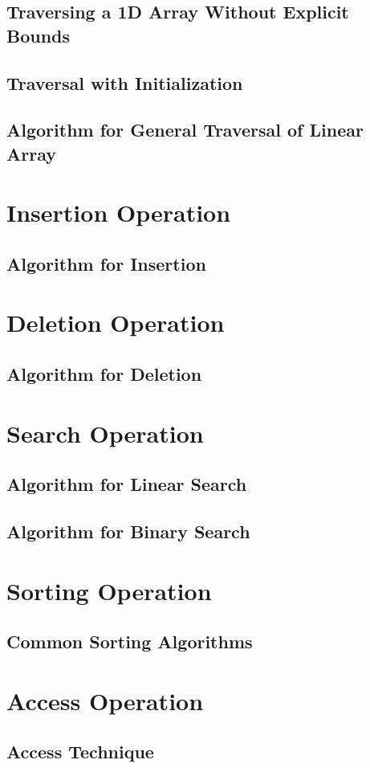 \documentclass[12pt, oneside]{book}
\begin{document}
\subsection{Traversing a 1D Array Without Explicit Bounds}
\subsection{Traversal with Initialization}
\subsection{Algorithm for General Traversal of Linear Array}
\section{Insertion Operation}
\subsection*{Algorithm for Insertion}
\section{Deletion Operation}
\subsection*{Algorithm for Deletion}
\section{Search Operation}
\subsection*{Algorithm for Linear Search}
\subsection*{Algorithm for Binary Search}
\section{Sorting Operation}
\subsection*{Common Sorting Algorithms}
\section{Access Operation}
\subsection*{Access Technique}
\end{document}

